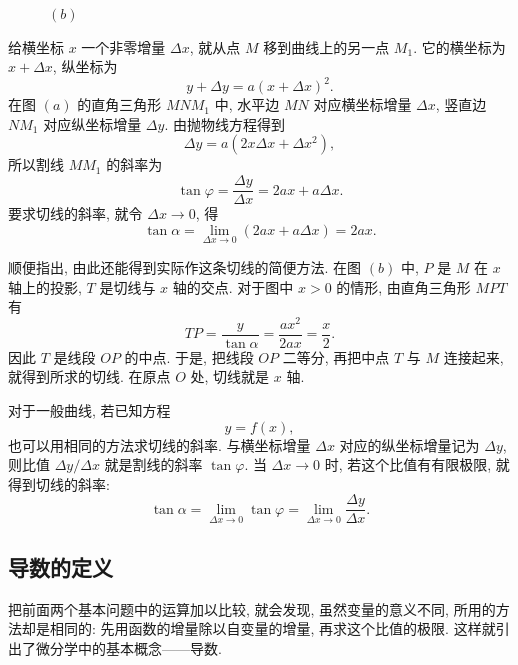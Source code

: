 \begin{figure}[!ht]
\begin{minipage}{0.48\textwidth}
        \par\smallskip $(b)$
    \end{minipage}
\end{figure}

给横坐标 $x$ 一个非零增量 $\Delta x$, 就从点 $M$ 移到曲线上的另一点 $M_1$.
它的横坐标为 $x+\Delta x$, 纵坐标为
$$
y+\Delta y=a(x+\Delta x)^2.
$$
在图 $(a)$ 的直角三角形 $MNM_1$ 中,
水平边 $MN$ 对应横坐标增量 $\Delta x$, 竖直边 $NM_1$ 对应纵坐标增量 $\Delta y$.
由抛物线方程得到
$$
\Delta y=a(2x\Delta x+\Delta x^2),
$$
所以割线 $MM_1$ 的斜率为
$$
\tan\varphi=\frac{\Delta y}{\Delta x}=2ax+a\Delta x.
$$
要求切线的斜率, 就令 $\Delta x\to0$, 得
$$
\tan\alpha=\lim_{\Delta x\to0}(2ax+a\Delta x)=2ax.
$$

顺便指出, 由此还能得到实际作这条切线的简便方法.
在图 $(b)$ 中, $P$ 是 $M$ 在 $x$ 轴上的投影, $T$ 是切线与 $x$ 轴的交点.
对于图中 $x>0$ 的情形, 由直角三角形 $MPT$ 有
$$
TP=\frac{y}{\tan\alpha}=\frac{ax^2}{2ax}=\frac x2.
$$
因此 $T$ 是线段 $OP$ 的中点.
于是, 把线段 $OP$ 二等分, 再把中点 $T$ 与 $M$ 连接起来, 就得到所求的切线.
在原点 $O$ 处, 切线就是 $x$ 轴.

对于一般曲线, 若已知方程
$$
y=f(x),
$$
也可以用相同的方法求切线的斜率.
与横坐标增量 $\Delta x$ 对应的纵坐标增量记为 $\Delta y$,
则比值 $\Delta y/\Delta x$ 就是割线的斜率 $\tan\varphi$.
当 $\Delta x\to0$ 时, 若这个比值有有限极限, 就得到切线的斜率:
$$
\tan\alpha=\lim_{\Delta x\to0}\tan\varphi
=\lim_{\Delta x\to0}\frac{\Delta y}{\Delta x}.
$$

\subsection{导数的定义}\label{subsec:92}
把前面两个基本问题中的运算加以比较, 就会发现, 虽然变量的意义不同,
所用的方法却是相同的: 先用函数的增量除以自变量的增量, 再求这个比值的极限.
这样就引出了微分学中的基本概念——导数.

